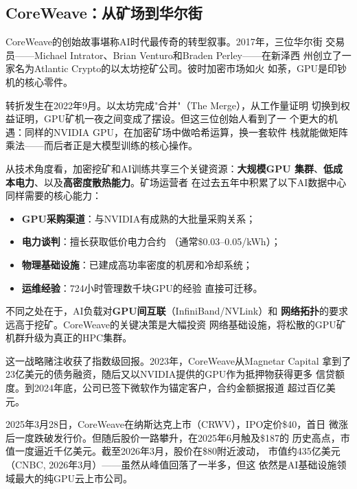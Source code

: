 \subsection{CoreWeave：从矿场到华尔街}
\label{subsec:coreweave}

CoreWeave的创始故事堪称AI时代最传奇的转型叙事。2017年，三位华尔街
交易员——Michael Intrator、Brian Venturo和Braden Perley——在新泽西
州创立了一家名为Atlantic Crypto的以太坊挖矿公司。彼时加密市场如火
如荼，GPU是印钞机的核心零件。

转折发生在2022年9月。以太坊完成"合并"（The Merge），从工作量证明
切换到权益证明，GPU矿机一夜之间变成了摆设。但这三位创始人看到了一
个更大的机遇：同样的NVIDIA GPU，在加密矿场中做哈希运算，换一套软件
栈就能做矩阵乘法——而后者正是大模型训练的核心操作。

\begin{whybox}[为什么加密矿场能转型AI？]
从技术角度看，加密挖矿和AI训练共享三个关键资源：\textbf{大规模GPU
集群}、\textbf{低成本电力}、以及\textbf{高密度散热能力}。矿场运营者
在过去五年中积累了以下AI数据中心同样需要的核心能力：
\begin{itemize}
  \item \textbf{GPU采购渠道}：与NVIDIA有成熟的大批量采购关系；
  \item \textbf{电力谈判}：擅长获取低价电力合约
    （通常\$0.03--0.05/kWh）；
  \item \textbf{物理基础设施}：已建成高功率密度的机房和冷却系统；
  \item \textbf{运维经验}：7\texttimes 24小时管理数千块GPU的经验
    直接可迁移。
\end{itemize}
不同之处在于，AI负载对\textbf{GPU间互联}（InfiniBand/NVLink）和
\textbf{网络拓扑}的要求远高于挖矿。CoreWeave的关键决策是大幅投资
网络基础设施，将松散的GPU矿机群升级为真正的HPC集群。
\end{whybox}

这一战略赌注收获了指数级回报。2023年，CoreWeave从Magnetar Capital
拿到了23亿美元的债务融资，随后又以NVIDIA提供的GPU作为抵押物获得更多
信贷额度。到2024年底，公司已签下微软作为锚定客户，合约金额据报道
超过百亿美元。

2025年3月28日，CoreWeave在纳斯达克上市（CRWV），IPO定价\$40，首日
微涨后一度跌破发行价。但随后股价一路攀升，在2025年6月触及\$187的
历史高点，市值一度逼近千亿美元。截至2026年3月，股价在\$80附近波动，
市值约435亿美元（CNBC, 2026年3月）——虽然从峰值回落了一半多，但这
依然是AI基础设施领域最大的纯GPU云上市公司。

